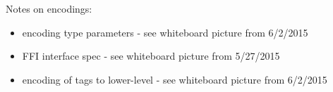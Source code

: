 \documentclass{article}
\begin{document}
Notes on encodings:

\begin{itemize}

\item encoding type parameters - see whiteboard picture from 6/2/2015

\item FFI interface spec - see whiteboard picture from 5/27/2015

\item encoding of tags to lower-level - see whiteboard picture from 6/2/2015

\end{itemize}




\end{document}
